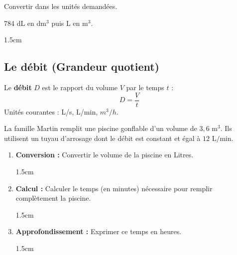 \documentclass[a4paper]{book}
\begin{document}
    \begin{exemple}
        Convertir dans les unités demandées.

        784 dL en dm$^3$ puis  L en m$^3$.

        \begin{ZoneReponse}{1.5cm}
        \end{ZoneReponse}
    \end{exemple}


\subsection{Le débit (Grandeur quotient)}
    
    \begin{definition}[Débit]
        Le \textbf{débit} $D$ est le rapport du volume $V$ par le temps $t$ : 
        \[ D = \frac{V}{t} \]
        Unités courantes : L/s, L/min, $m^3/h$.
    \end{definition}
    
    \begin{exemple}
        La famille Martin remplit une piscine gonflable d'un volume de $3,6 \text{ m}^3$. Ils utilisent un tuyau d'arrosage dont le débit est constant et égal à $12 \text{ L/min}$.
        
        \begin{enumerate}[leftmargin=*]
            \item \textbf{Conversion :} Convertir le volume de la piscine en Litres.

            \begin{ZoneReponse}{1.5cm}
            \end{ZoneReponse}

            \item \textbf{Calcul :} Calculer le temps (en minutes) nécessaire pour remplir complètement la piscine.

            \begin{ZoneReponse}{1.5cm}
            \end{ZoneReponse}

            \item \textbf{Approfondissement :} Exprimer ce temps en heures.

            \begin{ZoneReponse}{1.5cm}
            \end{ZoneReponse}
        \end{enumerate}
    \end{exemple}
        
\end{document}
